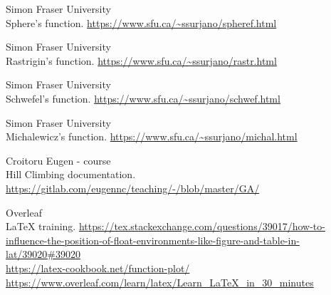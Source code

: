 \documentclass{article}
\begin{document}
\begin{thebibliography}{9}

  Simon Fraser University \\ Sphere's function.
  \url{https://www.sfu.ca/~ssurjano/spheref.html}

  Simon Fraser University \\  Rastrigin's function.
  \url{https://www.sfu.ca/~ssurjano/rastr.html}

  Simon Fraser University \\ Schwefel's function.
  \url{https://www.sfu.ca/~ssurjano/schwef.html}

  Simon Fraser University \\ Michalewicz's function.
  \url{https://www.sfu.ca/~ssurjano/michal.html}

\bibitem{}
  Croitoru Eugen - course \\ Hill Climbing documentation.
  \url{https://gitlab.com/eugennc/teaching/-/blob/master/GA/}

  Overleaf \\ LaTeX training.
  \url{https://tex.stackexchange.com/questions/39017/how-to-influence-the-position-of-float-environments-like-figure-and-table-in-lat/39020#39020} \\
  \url{https://latex-cookbook.net/function-plot/} \\  \url{https://www.overleaf.com/learn/latex/Learn_LaTeX_in_30_minutes}

\end{thebibliography}  
\end{document}
